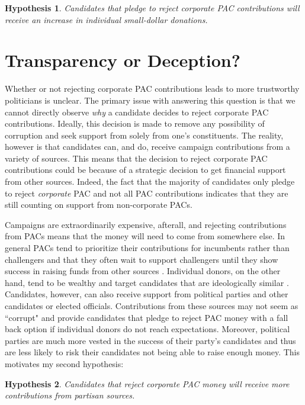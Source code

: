 \documentclass[12pt]{article}
\newtheorem{hyp}{Hypothesis}
\begin{document}
 \begin{hyp}
 	Candidates that pledge to reject corporate PAC contributions will receive an increase in individual small-dollar donations. 
 \end{hyp}



\section{Transparency or Deception?}

Whether or not rejecting corporate PAC contributions leads to more trustworthy politicians is unclear. The primary issue with answering this question is that we cannot directly observe \emph{why} a candidate decides to reject corporate PAC contributions. Ideally, this decision is made to remove any possibility of corruption and seek support from solely from one's constituents. The reality, however is that candidates can, and do, receive campaign contributions from a variety of sources. This means that the decision to reject corporate PAC contributions could be because of a strategic decision to get financial support from other sources. Indeed, the fact that the majority of candidates only pledge to reject \emph{corporate} PAC and not all PAC contributions indicates that they are still counting on support from non-corporate PACs.
 
 Campaigns are extraordinarily expensive, afterall, and rejecting contributions from PACs means that the money will need to come from somewhere else. In general PACs tend to prioritize their contributions for incumbents rather than challengers \citep{brunell2005} and that they often wait to support challengers until they show success in raising funds from other sources \citep{biersack1993}. Individual donors, on the other hand, tend to be wealthy \citep{brown1995} and target candidates that are ideologically similar \citep{bonica2014}. Candidates, however, can also receive support from political parties and other candidates or elected officials. Contributions from these sources may not seem as ``corrupt" and provide candidates that pledge to reject PAC money with a fall back option if individual donors do not reach expectations. Moreover, political parties are much more vested in the success of their party's candidates and thus are less likely to risk their candidates not being able to raise enough money. This motivates my second hypothesis:
 
 \begin{hyp}
 	Candidates that reject corporate PAC money will receive more contributions from partisan sources.  
 \end{hyp}
 
\end{document}

